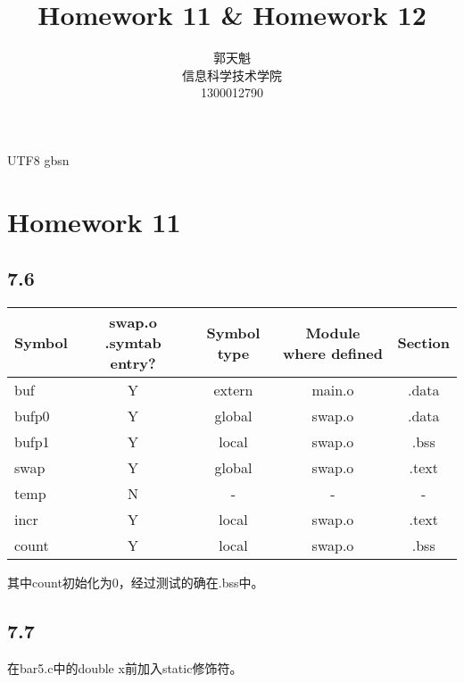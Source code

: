 \documentclass {article}
\begin{document}
  \begin {CJK*} {UTF8} {gbsn}
    \title {\textbf {\Huge Homework 11 \& Homework 12}}
		\author {郭天魁 \\ 信息科学技术学院 \\ 1300012790}

		\maketitle
		
		\section{Homework 11}
			\subsection{7.6}
				\begin{table}[h]
					\begin{tabular}{lcccc}
						Symbol & swap.o .symtab entry? & Symbol type & Module where defined & Section \\ \hline
						buf    & Y                     & extern      & main.o               & .data   \\
						bufp0  & Y                     & global      & swap.o               & .data   \\
						bufp1  & Y                     & local       & swap.o               & .bss    \\
						swap   & Y                     & global      & swap.o               & .text   \\
						temp   & N                     & -           & -                    & -       \\
						incr   & Y                     & local       & swap.o               & .text   \\
						count  & Y                     & local       & swap.o               & .bss   
					\end{tabular}
				\end{table}
				其中count初始化为0，经过测试的确在.bss中。
			
			\subsection{7.7}
				在bar5.c中的double x前加入static修饰符。
				

\end{CJK*}
\end{document}
